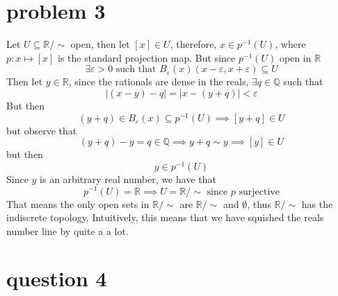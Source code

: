 \documentclass[a4paper,11pt]{article}
\begin{document}
\section{problem 3}
Let $U \subseteq \mathbb{R}/ \sim$ open, then let $[x] \in U$, therefore, $x \in p^{-1}(U)$, where $p \colon x \mapsto [x]$ is the standard projection map. But since $p^{-1}(U)$ open in $\mathbb{R}$
\begin{equation}
	\exists \varepsilon > 0 \text{ such that } B_\varepsilon(x) (x-\varepsilon,x+\varepsilon) \subseteq U
\end{equation}
Then let $y \in \mathbb{R}$, since the rationals are dense in the reals, $\exists q \in \mathbb{Q}$ such that 
\begin{equation}
	|(x-y)-q| = |x-(y+q)| < \varepsilon
\end{equation}
But then 
\begin{equation}
	(y+q) \in B_\varepsilon(x) \subseteq p^{-1}(U) \implies [y+q] \in U
\end{equation}
but observe that
\begin{equation}
	(y+q) - y = q \in \mathbb{Q} \implies y+q \sim y \implies [y] \in U
\end{equation}
but then 
\begin{equation}
	y \in p^{-1}(U)
\end{equation}
Since $y$ is an arbitrary real number, we have that 
\begin{equation}
	p^{-1}(U) = \mathbb{R} \implies U = \mathbb{R}/\sim \text{ since $p$ surjective}
\end{equation}
That means the only open sets in $\mathbb{R}/\sim$ are $\mathbb{R}/\sim$ and $\emptyset$, thus $\mathbb{R}/\sim$ has the indiscrete topology. Intuitively, this means that we have squished the reals number line by quite a a lot. 
\clearpage

\section{question 4}
\end{document}
